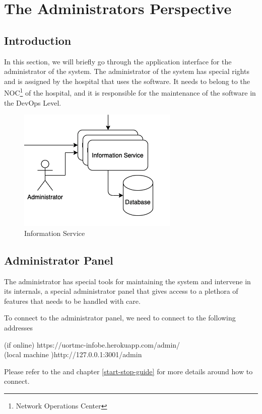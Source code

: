 \chapter{The Administrators Perspective}
\label{admin_perspective}
	\section{Introduction}
		In this section, we will briefly go through the application interface for the administrator of the system. 
		The administrator of the system has special rights and is assigned by the hospital that uses the software. 
		It needs to belong to the NOC\footnote{Network  Operations Center} of the hospital, and it is responsible for 
		the maintenance of the software in the DevOps Level.
		\begin{figure}[H]
			\iftrue
			\caption{Information Service}
			\centering
			\includegraphics[scale=0.5]{figures/infobe}
			\fi
		\end{figure}
	\section{Administrator Panel}
		The administrator has special tools for maintaining the system and intervene in its internals, a special administrator panel that gives access to a 
		plethora of features that needs to be handled with care. 
		\begin{note}
			To connect to the administrator panel, we need to connect to the following addresses\\
			\begin{center}
				(if online) https://uortmc-infobe.herokuapp.com/admin/ \\
				(local machine )http://127.0.0.1:3001/admin
			\end{center}
			Please refer to the and chapter \ref{start-stop-guide} for more details around how to connect.
		\end{note}
